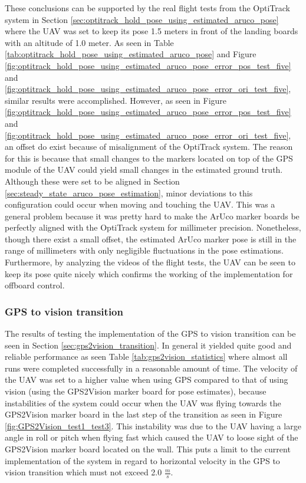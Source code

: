 \documentclass[../Head/report.tex]{subfiles}
\begin{document}
These conclusions can be supported by the real flight tests from the OptiTrack system in Section \ref{sec:optitrack_hold_pose_using_estimated_aruco_pose} where the UAV was set to keep its pose 1.5 meters in front of the landing boards with an altitude of 1.0 meter. As seen in Table \ref{tab:optitrack_hold_pose_using_estimated_aruco_pose} and Figure \ref{fig:optitrack_hold_pose_using_estimated_aruco_pose_error_pos_test_five} and \ref{fig:optitrack_hold_pose_using_estimated_aruco_pose_error_ori_test_five},  similar results were accomplished. However, as seen in Figure \ref{fig:optitrack_hold_pose_using_estimated_aruco_pose_error_pos_test_five} and \ref{fig:optitrack_hold_pose_using_estimated_aruco_pose_error_ori_test_five}, an offset do exist because of misalignment of the OptiTrack system. The reason for this is because that small changes to the markers located on top of the GPS module of the UAV could yield small changes in the estimated ground truth. Although these were set to be aligned in Section \ref{sec:steady_state_aruco_pose_estimation}, minor deviations to this configuration could occur when moving and touching the UAV. This was a general problem because it was pretty hard to make the ArUco marker boards be perfectly aligned with the OptiTrack system for millimeter precision. Nonetheless, though there exist a small offset, the estimated ArUco marker pose is still in the range of millimeters with only negligible fluctuations in the pose estimations. Furthermore, by analyzing the videos of the flight tests, the UAV can be seen to keep its pose quite nicely which confirms the working of the implementation for offboard control. 

\subsubsection*{GPS to vision transition}
The results of testing the implementation of the GPS to vision transition can be seen in Section \ref{sec:gps2vision_transition}. In general it yielded quite good and reliable performance as seen Table \ref{tab:gps2vision_statistics} where almost all runs were completed successfully in a reasonable amount of time. The velocity of the UAV was set to a higher value when using GPS compared to that of using vision (using the GPS2Vision marker board for pose estimates), because instabilities of the system could occur when the UAV was flying towards the GPS2Vision marker board in the last step of the transition as seen in Figure \ref{fig:GPS2Vision_test1_test3}. This instability was due to the UAV having a large angle in roll or pitch when flying fast which caused the UAV to loose sight of the GPS2Vision marker board located on the wall. This puts a limit to the current implementation of the system in regard to horizontal velocity in the GPS to vision transition which must not exceed 2.0 $\frac{m}{s}$. 
\end{document}
